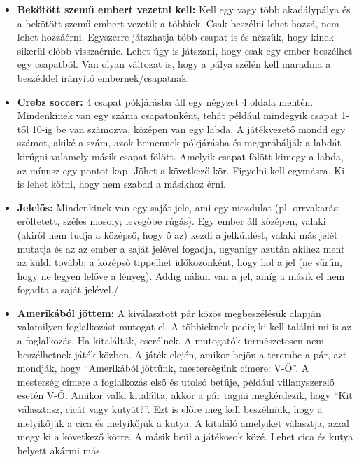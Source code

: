 \documentclass[a4paper, 12pt, twoside, openright]{article}
\begin{document}
\begin{itemize}
\item \textbf{Bekötött szemű embert vezetni kell:} Kell egy vagy több akadálypálya és a bekötött szemű embert vezetik a többiek. Csak beszélni lehet hozzá, nem lehet hozzáérni. Egyszerre játszhatja több csapat is és nézzük, hogy kinek sikerül előbb visszaérnie. Lehet úgy is játszani, hogy csak egy ember beszélhet egy csapatból. Van olyan változat is, hogy a pálya szélén kell maradnia a beszéddel irányító embernek/csapatnak.

\item \textbf{Crebs soccer:} 4 csapat pókjárásba áll egy négyzet 4 oldala mentén. Mindenkinek van egy száma csapatonként, tehát például mindegyik csapat 1-től 10-ig be van számozva, középen van egy labda. A játékvezető mondd egy számot, akiké a szám, azok bemennek pókjárásba és megpróbálják a labdát kirúgni valamely másik csapat fölött. Amelyik csapat fölött kimegy a labda, az mínusz egy pontot kap. Jöhet a következő kör. Figyelni kell egymásra. Ki is lehet kötni, hogy nem szabad a másikhoz érni.

\item \textbf{Jelelős:} Mindenkinek van egy saját jele, ami egy mozdulat (pl. orrvakarás; erőltetett, széles mosoly; levegőbe rúgás). Egy ember áll középen, valaki (akiről nem tudja a középső, hogy ő az) kezdi a jelküldést, valaki más jelét mutatja és az az ember a saját jelével fogadja, ugyanígy azután akihez ment az küldi tovább; a középső tippelhet időközönként, hogy hol a jel (ne sűrűn, hogy ne legyen lelőve a lényeg). Addig nálam van a jel, amíg a másik el nem fogadta a saját jelével./

\item \textbf{Amerikából jöttem:} A kiválasztott pár közös megbeszélésük alapján valamilyen foglalkozást mutogat el. A többieknek pedig ki kell találni mi is az a foglalkozás. Ha kitalálták, cserélnek. A mutogatók természetesen nem beszélhetnek játék közben. A játék elején, amikor bejön a terembe a pár, azt mondják, hogy ``Amerikából jöttünk, mesterségünk címere: V-Ő''. A mesterség címere a foglalkozás első és utolsó betűje, például villanyszerelő esetén V-Ő. Amikor valki kitalálta, akkor a pár tagjai megkérdezik, hogy ``Kit választasz, cicát vagy kutyát?''. Ezt is előre meg kell beszélniük, hogy a melyikőjük a cica és melyikőjük a kutya. A kitaláló amelyiket választja, azzal megy ki a következő körre. A másik beül a játékosok közé. Lehet cica és kutya helyett akármi más.














\end{itemize}
\end{document}

